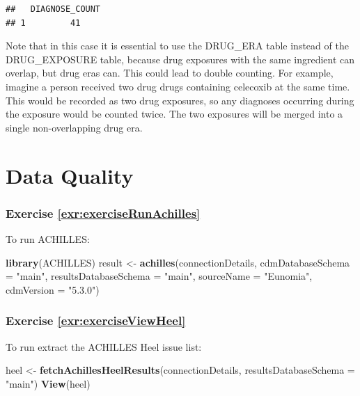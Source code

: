 \documentclass[11pt]{book}
\newenvironment{Shaded}{\begin{snugshade}}{\end{snugshade}}
\newcommand{\DataTypeTok}[1]{\textcolor[rgb]{0.13,0.29,0.53}{#1}}
\newcommand{\KeywordTok}[1]{\textcolor[rgb]{0.13,0.29,0.53}{\textbf{#1}}}
\newcommand{\NormalTok}[1]{#1}
\newcommand{\StringTok}[1]{\textcolor[rgb]{0.31,0.60,0.02}{#1}}
\theoremstyle{definition}
\theoremstyle{definition}
\theoremstyle{definition}
\theoremstyle{remark}
\begin{document}
\begin{verbatim}
##   DIAGNOSE_COUNT
## 1         41
\end{verbatim}

Note that in this case it is essential to use the DRUG\_ERA table instead of the DRUG\_EXPOSURE table, because drug exposures with the same ingredient can overlap, but drug eras can. This could lead to double counting. For example, imagine a person received two drug drugs containing celecoxib at the same time. This would be recorded as two drug exposures, so any diagnoses occurring during the exposure would be counted twice. The two exposures will be merged into a single non-overlapping drug era.

\hypertarget{DataQualityanswers}{%
\section{Data Quality}\label{DataQualityanswers}}

\hypertarget{exercise-refexrexerciserunachilles}{%
\subsubsection*{Exercise \ref{exr:exerciseRunAchilles}}\label{exercise-refexrexerciserunachilles}}

To run ACHILLES:

\begin{Shaded}
\begin{Highlighting}[]
\KeywordTok{library}\NormalTok{(ACHILLES)}
\NormalTok{result <-}\StringTok{ }\KeywordTok{achilles}\NormalTok{(connectionDetails,}
                   \DataTypeTok{cdmDatabaseSchema =} \StringTok{"main"}\NormalTok{,}
                   \DataTypeTok{resultsDatabaseSchema =} \StringTok{"main"}\NormalTok{,}
                   \DataTypeTok{sourceName =} \StringTok{"Eunomia"}\NormalTok{,}
                   \DataTypeTok{cdmVersion =} \StringTok{"5.3.0"}\NormalTok{)}
\end{Highlighting}
\end{Shaded}

\hypertarget{exercise-refexrexerciseviewheel}{%
\subsubsection*{Exercise \ref{exr:exerciseViewHeel}}\label{exercise-refexrexerciseviewheel}}

To run extract the ACHILLES Heel issue list:

\begin{Shaded}
\begin{Highlighting}[]
\NormalTok{heel <-}\StringTok{ }\KeywordTok{fetchAchillesHeelResults}\NormalTok{(connectionDetails,}
                                 \DataTypeTok{resultsDatabaseSchema =} \StringTok{"main"}\NormalTok{)}
\KeywordTok{View}\NormalTok{(heel)}
\end{Highlighting}
\end{Shaded}



\backmatter
\printindex
\end{document}
